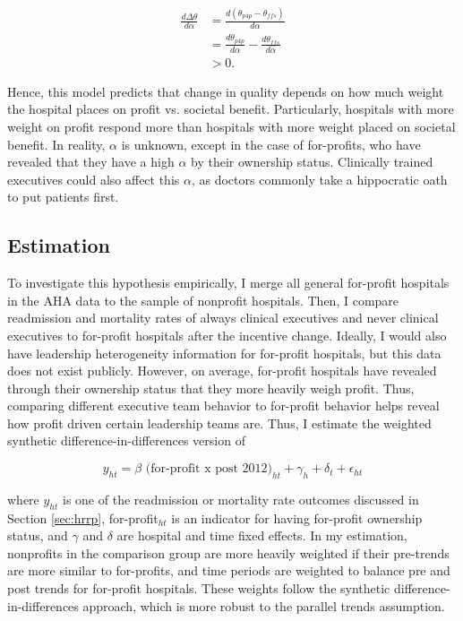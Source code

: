 \documentclass[12pt]{article}
\begin{document}
    \begin{align*}
        \frac{d\Delta\theta}{d\alpha}&=\frac{d(\theta_{p4p}-\theta_{ffs})}{d\alpha}\\
        &=\frac{d\theta_{p4p}}{d\alpha}-\frac{d\theta_{ffs}}{d\alpha}\\
        &> 0.
    \end{align*}


    Hence, this model predicts that change in quality depends on how much weight the hospital places on profit vs. societal benefit. Particularly, hospitals with more weight on profit respond more than hospitals with more weight placed on societal benefit. In reality, $\alpha$ is unknown, except in the case of for-profits, who have revealed that they have a high $\alpha$ by their ownership status. Clinically trained executives could also affect this $\alpha$, as doctors commonly take a hippocratic oath to put patients first. 

    \subsection{Estimation}


    To investigate this hypothesis empirically, I merge all general for-profit hospitals in the AHA data to the sample of nonprofit hospitals. Then, I compare readmission and mortality rates of always clinical executives and never clinical executives to for-profit hospitals after the incentive change. Ideally, I would also have leadership heterogeneity information for for-profit hospitals, but this data does not exist publicly. However, on average, for-profit hospitals have revealed through their ownership status that they more heavily weigh profit. Thus, comparing different executive team behavior to for-profit behavior helps reveal how profit driven certain leadership teams are. Thus, I estimate the weighted synthetic difference-in-differences version of

    \begin{equation}
    \label{eq:forprofit}
    y_{ht} = \beta \text{ (for-profit x post 2012)}_{ht} + \gamma_{h} + \delta_t + \epsilon_{ht}
    \end{equation}

    \noindent where $y_{ht}$ is one of the readmission or mortality rate outcomes discussed in Section \ref{sec:hrrp}, for-profit$_{ht}$ is an indicator for having for-profit ownership status, and $\gamma$ and $\delta$ are hospital and time fixed effects. In my estimation, nonprofits in the comparison group are more heavily weighted if their pre-trends are more similar to for-profits, and time periods are weighted to balance pre and post trends for for-profit hospitals. These weights follow the synthetic difference-in-differences approach, which is more robust to the parallel trends assumption. 
    
\end{document}
